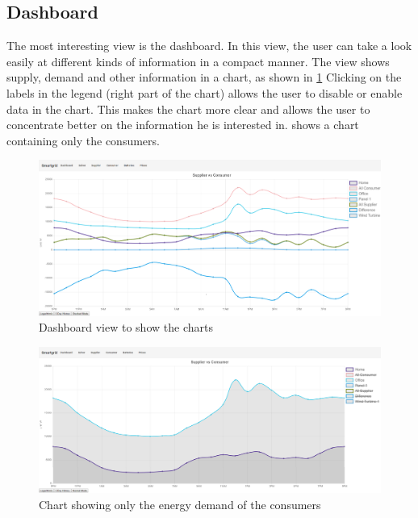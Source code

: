 \subsection{Dashboard}
The most interesting view is the dashboard.
In this view, the user can take a look easily at different kinds of information in a compact manner.
The view shows supply, demand and other information in a chart, as shown in \cref{fig:dashboard}
Clicking on the labels in the legend (right part of the chart) allows the user to disable or enable data in the chart.
This makes the chart more clear and allows the user to concentrate better on the information he is interested in.
 shows a chart containing only the consumers.
\begin{figure}[!h]
	\centering
	\includegraphics[width=1.00\textwidth]{../figures/OverviewCut.png}
	\caption{Dashboard view to show the charts}
	\label{fig:dashboard}
\end{figure}

\begin{figure}[h]
    \centering
\includegraphics[width=1.00\textwidth]{../figures/ConsumerStackedCut.png}
    \caption{Chart showing only the energy demand of the consumers}
    \label{fig:consumerChart}
\end{figure}

